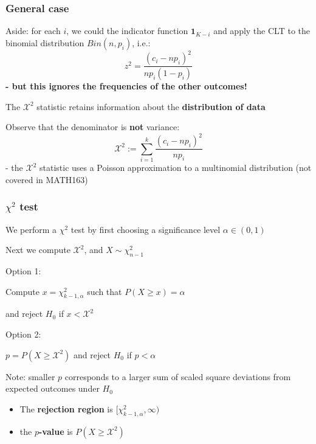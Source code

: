 \documentclass[t,8pt]{beamer}%
\begin{document}
\begin{frame}
	\frametitle{General case}
    Aside: for each $i$, we could the indicator function $\mathbf 1_{K-i}$ and apply the CLT to the binomial distribution $Bin(n,p_i)$, i.e.:
    $$z^2=\frac{(c_i-np_i)^2}{np_i(1-p_i)}$$
    {\bf - but this ignores the frequencies of the other outcomes!} \par
    The $\mathcal{X}^2$ statistic retains information about the {\bf distribution of data} \par
    Observe that the denominator is {\bf not} variance:
    $$\mathcal{X}^2:=\sum_{i=1}^k\frac{(c_i-np_i)^2}{np_i}$$
    - the $\mathcal{X}^2$ statistic uses a Poisson approximation to a multinomial distribution (not covered in MATH163)
\end{frame}

\begin{frame}
	\frametitle{$\chi^2$ test}
    We perform a $\chi^2$ test by first choosing a significance level $\alpha\in(0,1)$ \par
    Next we compute $\mathcal{X}^2$, and $X\sim\chi^2_{n-1}$ \par
    Option 1: \par
    Compute $x=\chi^2_{k-1,\alpha}$ such that $P(X\geq x)=\alpha$ \par
    and reject $H_0$ if $x<\mathcal{X}^2$ \par
    Option 2: \par
    $p=P(X\geq\mathcal{X}^2)$ and reject $H_0$ if $p<\alpha$ \par
    Note: smaller $p$ corresponds to a larger sum of scaled square deviations from expected outcomes under $H_0$ \par
    \begin{itemize}
        \item The {\bf rejection region} is $[\chi^2_{k-1,\alpha},\infty)$
        \item the {\bf $p$-value} is $P(X\geq\mathcal{X}^2)$
    \end{itemize}
\end{frame}
\end{document}
